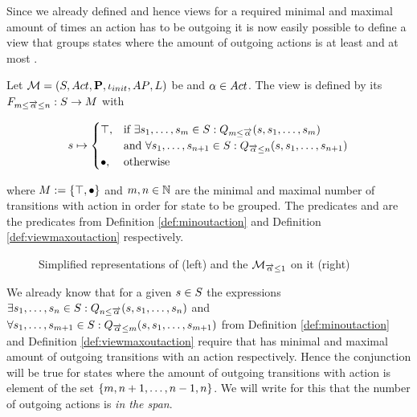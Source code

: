 \documentclass[preview]{standalone}
\begin{document}
Since we already defined \grpfctsN and hence views for a required minimal and maximal amount of times an action has to be outgoing it is now easily possible to define a view that groups states where the amount of outgoing actions is at least \numoutact and at most \numoutactb. 

\begin{definition}
	Let $\chgph = \chgphtuple$ be \achgphN and $\action \in \actions$. The view 
	\viewspanoutaction is defined by its \grpfctN $\gfctspanoutaction : \states \to \arbset$ with
	
	\[
	\state \mapsto
	\begin{cases}
			\group,				& \text{if } \exists \state_1, \dots, \state_\numoutactb \in \states: \predminoutact[\numoutactb] \\ &\text{and } \forall \state_1, \dots, \state_{\numoutact+1} \in \states: \predmaxoutact \\
			\remelem,          	& \text{otherwise}
		\end{cases}
	\]
	
	where $\imggrp := \imggrpbinview$
	and $\numoutactb, \numoutact \in \natnums$ are the minimal and maximal number of transitions with action \action in order for state to be grouped. The predicates \predminoutact and \predmaxoutact are the predicates from Definition \ref{def:minoutaction} and Definition \ref{def:viewmaxoutaction} respectively.
\end{definition}

\begin{figure}[h]
	\begin{minipage}{.5\textwidth}
		\hspace{5mm}
		
	\end{minipage}%
	\begin{minipage}{.5\textwidth}
		\hspace{5mm}
		
	\end{minipage}
	\caption{Simplified representations of \mdp (left) and the \viewN $\view[\pptymaxoutact{1}{\outact}]$ on it (right)}
	\label{fig:outActMaxAfter} 
\end{figure}

We already know that for a given $\state \in \states$ the expressions $\exists \state_1, \dots, \state_\numoutact \in \states: \predminoutact$ and $\forall \state_1, \dots, \state_{\numoutactb+1} \in \states: \predmaxoutact[\numoutactb]$ from Definition \ref{def:minoutaction} and Definition \ref{def:viewmaxoutaction} require that \state has minimal and maximal amount of outgoing transitions with an action \action respectively. Hence the conjunction will be true for states where the amount of outgoing transitions with action \action is element of the set $\{\numoutactb, \numoutact+1, \dots, \numoutact-1, \numoutact\}$. We will write for this that the number of outgoing actions is \emph{in the span}.
\end{document}
